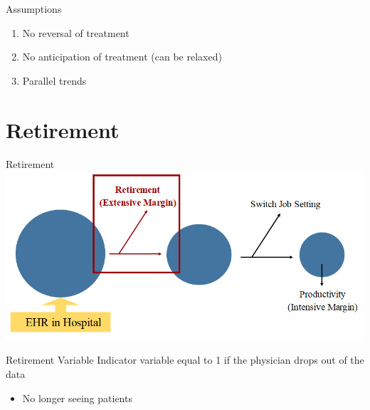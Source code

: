 \documentclass[10pt]{beamer}
\begin{document}
\begin{frame}{Assumptions}
\begin{enumerate}
    \item No reversal of treatment
    \vspace{3mm}
    \item No anticipation of treatment (can be relaxed)
    \vspace{3mm}
    \item Parallel trends
\end{enumerate}
\end{frame}


\section{Retirement}



\begin{frame}{Retirement}
    \centering
    \includegraphics[scale=.5]{Objects/EHR_FlowChart_Retire.PNG}
\end{frame}

\begin{frame}{Retirement Variable}
Indicator variable equal to 1 if the physician drops out of the data 
\vspace{3mm}
\begin{itemize}
    \item No longer seeing patients
\end{itemize}
\end{frame}
\end{document}

